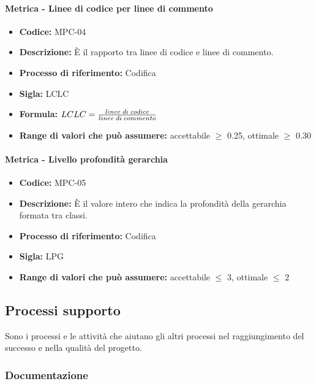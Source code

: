     \paragraph{Metrica - Linee di codice per linee di commento}
    \begin{itemize}
        \item \textbf{Codice:} MPC-04
        \item \textbf{Descrizione:} È il rapporto tra linee di codice e linee di commento.
        \item \textbf{Processo di riferimento:} Codifica
        \item \textbf{Sigla:} LCLC
        \item \textbf{Formula:} \begin{math}{LCLC = {linee \; di \; codice \over linee \; di \; commento}}\end{math}
        \item \textbf{Range di valori che può assumere:} accettabile $\geq$ 0.25, ottimale $\geq$ 0.30
    \end{itemize}

    \paragraph{Metrica - Livello profondità gerarchia}
    \begin{itemize}
        \item \textbf{Codice:} MPC-05
        \item \textbf{Descrizione:} È il valore intero che indica la profondità della gerarchia formata tra classi.
        \item \textbf{Processo di riferimento:} Codifica
        \item \textbf{Sigla:} LPG
        \item \textbf{Range di valori che può assumere:} accettabile $\leq$ 3, ottimale $\leq$ 2
    \end{itemize}

\subsection{Processi supporto}
Sono i processi e le attività che aiutano gli altri processi nel raggiungimento del successo e nella qualità del progetto.
  
\subsubsection{Documentazione}
